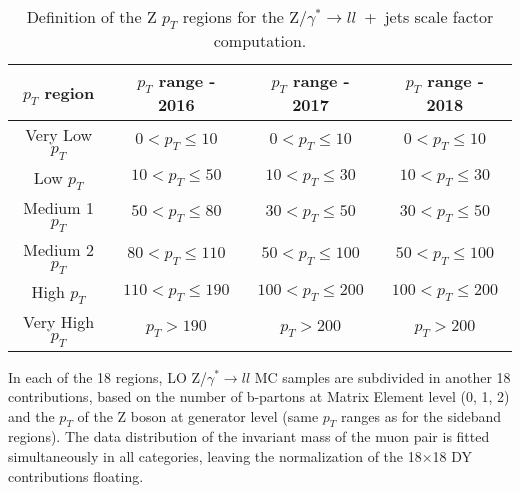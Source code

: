 \documentclass[../main.tex]{subfiles}
\begin{document}
\begin{table}[h!]
\begin{center}
\begin{tabular}{c | c | c | c}
$p_T$ region & $p_T$ range - 2016 & $p_T$ range - 2017 & $p_T$
range - 2018 \\\hline
Very Low $p_T$  & $0<p_T\leq 10$    & $0<p_T\leq 10$    & $0<p_T\leq 10$     \\
Low $p_T$       & $10<p_T\leq 50$   & $10<p_T\leq 30$   & $10<p_T\leq 30$    \\
Medium 1 $p_T$  & $50<p_T\leq 80$   & $30<p_T\leq 50$   & $30<p_T\leq 50$    \\
Medium 2 $p_T$  & $80<p_T\leq 110$  & $50<p_T\leq 100$  & $50<p_T\leq 100$    \\
High $p_T$      & $110<p_T\leq 190$ & $100<p_T\leq 200$ & $100<p_T\leq 200$  \\
Very High $p_T$ & $p_T> 190$        & $p_T> 200$        & $p_T> 200$       
\end{tabular}
\caption{Definition of the Z $p_T$ regions for the Z/$\gamma^*\to ll$~+~jets scale factor computation.}
\label{hh:tab:dy_sf}
\end{center}
\end{table}

In each of the 18 regions, LO Z/$\gamma^*\to ll$ MC samples are subdivided in another 18 contributions, based on the number of b-partons at Matrix Element level (0, 1, 2) and the $p_T$ of the Z boson at generator level (same $p_T$ ranges as for the sideband regions). The data distribution of the invariant mass of the muon pair is fitted simultaneously in all categories, leaving the normalization of the 18$\times$18 DY contributions floating. %


%
\end{document}
